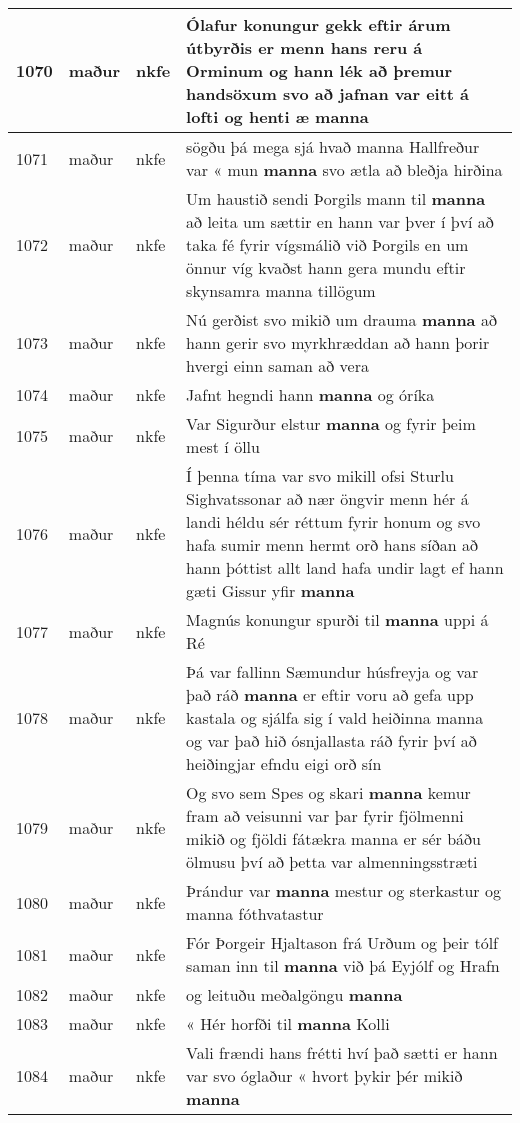 \documentclass{article}
\begin{document}
\begin{longtable}{p{1cm}|p{1cm}|p{1cm}|p{13cm}}
\hline
1070&maður&nkfe&Ólafur konungur gekk eftir árum útbyrðis er menn hans reru á Orminum og hann lék að þremur handsöxum svo að jafnan var eitt á lofti og henti æ \textbf{manna} \\
\hline
1071&maður&nkfe&sögðu þá mega sjá hvað manna Hallfreður var « mun \textbf{manna} svo ætla að bleðja hirðina\\
\hline
1072&maður&nkfe&Um haustið sendi Þorgils mann til \textbf{manna} að leita um sættir en hann var þver í því að taka fé fyrir vígsmálið við Þorgils en um önnur víg kvaðst hann gera mundu eftir skynsamra manna tillögum\\
\hline
1073&maður&nkfe&Nú gerðist svo mikið um drauma \textbf{manna} að hann gerir svo myrkhræddan að hann þorir hvergi einn saman að vera\\
\hline
1074&maður&nkfe&Jafnt hegndi hann \textbf{manna} og óríka\\
\hline
1075&maður&nkfe&Var Sigurður elstur \textbf{manna} og fyrir þeim mest í öllu\\
\hline
1076&maður&nkfe&Í þenna tíma var svo mikill ofsi Sturlu Sighvatssonar að nær öngvir menn hér á landi héldu sér réttum fyrir honum og svo hafa sumir menn hermt orð hans síðan að hann þóttist allt land hafa undir lagt ef hann gæti Gissur yfir \textbf{manna} \\
\hline
1077&maður&nkfe&Magnús konungur spurði til \textbf{manna} uppi á Ré\\
\hline
1078&maður&nkfe&Þá var fallinn Sæmundur húsfreyja og var það ráð \textbf{manna} er eftir voru að gefa upp kastala og sjálfa sig í vald heiðinna manna og var það hið ósnjallasta ráð fyrir því að heiðingjar efndu eigi orð sín\\
\hline
1079&maður&nkfe&Og svo sem Spes og skari \textbf{manna} kemur fram að veisunni var þar fyrir fjölmenni mikið og fjöldi fátækra manna er sér báðu ölmusu því að þetta var almenningsstræti\\
\hline
1080&maður&nkfe&Þrándur var \textbf{manna} mestur og sterkastur og manna fóthvatastur\\
\hline
1081&maður&nkfe&Fór Þorgeir Hjaltason frá Urðum og þeir tólf saman inn til \textbf{manna} við þá Eyjólf og Hrafn\\
\hline
1082&maður&nkfe&og leituðu meðalgöngu \textbf{manna} \\
\hline
1083&maður&nkfe&« Hér horfði til \textbf{manna} Kolli\\
\hline
1084&maður&nkfe&Vali frændi hans frétti hví það sætti er hann var svo óglaður « hvort þykir þér mikið \textbf{manna} \\

\end{longtable}
\end{document}
